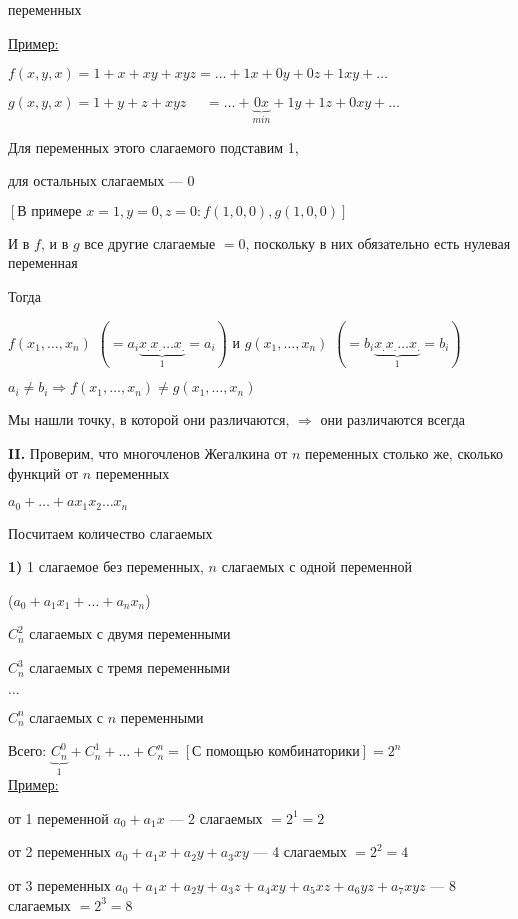 \documentclass[a4paper, 12pt] {article}
\begin{document}
переменных

\underline{Пример:}

$ f(x, y, x) = 1+x+xy+xyz = \dots + 1x + 0y +0z +1xy + \dots$

$ g(x, y, x) = 1+y+z+xyz \text{	} \text{	}= \dots + \underbrace{0x}_{min} + 1y +1z + 0xy + \dots$

Для переменных этого слагаемого подставим 1, 

для остальных слагаемых --- 0

$ \left[ \text{В примере } x=1, y=0, z=0: f(1,0,0), g(1,0,0) \right] $

И в $ f $, и в $ g $ все другие слагаемые $ =0 $, поскольку в них обязательно есть нулевая переменная

Тогда 

$ f(x_{1}, \dots , x_{n})$ $ (= a_{i}\underbrace{x_{.}x_{.}\dots x_{.}}_1=a_{i}) $ и $ g(x_{1}, \dots , x_{n})$ $ (= b_{i}\underbrace{x_{.}x_{.}\dots x_{.}}_1=b_{i}) $ 

$ a_{i} \ne b_{i} \Rightarrow f(x_{1}, \dots , x_{n}) \ne g(x_{1}, \dots , x_{n})$

Мы нашли точку, в которой они различаются,  $ \Rightarrow $ они различаются всегда

\textbf{II.} Проверим, что многочленов Жегалкина от $ n $ переменных столько же, сколько функций от $ n $ переменных

$ a_{0}+\dots+ax_{1}x_{2}\dots x_{n} $

Посчитаем количество слагаемых

\textbf{1)} 1 слагаемое без переменных, $ n $ слагаемых с одной переменной 

($ a_{0}+ a_{1} x_{1}+\dots+a_{n} x_{n} $)

$ C_{n}^{2} $ слагаемых с двумя переменными 

$ C_{n}^{3} $ слагаемых с тремя переменными 

$ \dots $

$ C_{n}^{n} $ слагаемых с $ n $ переменными 

Всего: $ \underbrace{C_{n}^{0}}_1 + C_{n}^{1}+\dots+C_{n}^{n}=[\text{С помощью комбинаторики}]=2^{n} $\\

\underline{Пример:}

от 1 переменной $ a_{0} +a_{1}x$ --- 2 слагаемых $ = 2^{1}=2 $

от 2 переменных $ a_{0} +a_{1}x+a_{2}y +a_{3}xy$ --- 4 слагаемых $ = 2^{2}=4 $

от 3 переменных $ a_{0} +a_{1}x+a_{2}y +a_{3}z + a_{4}xy+a_{5}xz+a_{6}yz+a_{7}xyz$ --- 8 слагаемых $ = 2^{3}=8 $\\
\end{document}
